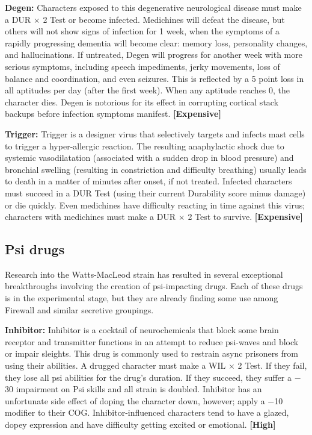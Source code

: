 \textbf{Degen:} Characters exposed to this degenerative neurological disease must make a DUR $\times$ 2 Test or become infected. Medichines will defeat the disease, but others will not show signs of infection for 1 week, when the symptoms of a rapidly progressing dementia will become clear: memory loss, personality changes, and hallucinations. If untreated, Degen will progress for another week with more serious symptoms, including speech impediments, jerky movements, loss of balance and coordination, and even seizures. This is reflected by a 5 point loss in all aptitudes per day (after the first week). When any aptitude reaches 0, the character dies. Degen is notorious for its effect in corrupting cortical stack backups before infection symptoms manifest. \textbf{[Expensive]} 

\textbf{Trigger:} Trigger is a designer virus that selectively targets and infects mast cells to trigger a hyper-allergic reaction. The resulting anaphylactic shock due to systemic vasodilatation (associated with a sudden drop in blood pressure) and bronchial swelling (resulting in constriction and difficulty breathing) usually leads to death in a matter of minutes after onset, if not treated. Infected characters must succeed in a DUR Test (using their current Durability score minus damage) or die quickly. Even medichines have difficulty reacting in time against this virus; characters with medichines must make a DUR $\times$ 2 Test to survive. \textbf{[Expensive]} 



\subsection{Psi drugs} \label{sec:psi-drugs} 

Research into the Watts-MacLeod strain has resulted in several exceptional breakthroughs involving the creation of psi-impacting drugs. Each of these drugs is in the experimental stage, but they are already finding some use among Firewall and similar secretive groupings. 

\textbf{Inhibitor:} Inhibitor is a cocktail of neurochemicals that block some brain receptor and transmitter functions in an attempt to reduce psi-waves and block or impair sleights. This drug is commonly used to restrain async prisoners from using their abilities. A drugged character must make a WIL $\times$ 2 Test. If they fail, they lose all psi abilities for the drug’s duration. If they succeed, they suffer a $-$30 impairment on Psi skills and all strain is doubled. Inhibitor has an unfortunate side effect of doping the character down, however; apply a $-$10 modifier to their COG. Inhibitor-influenced characters tend to have a glazed, dopey expression and have difficulty getting excited or emotional. \textbf{[High]} 

